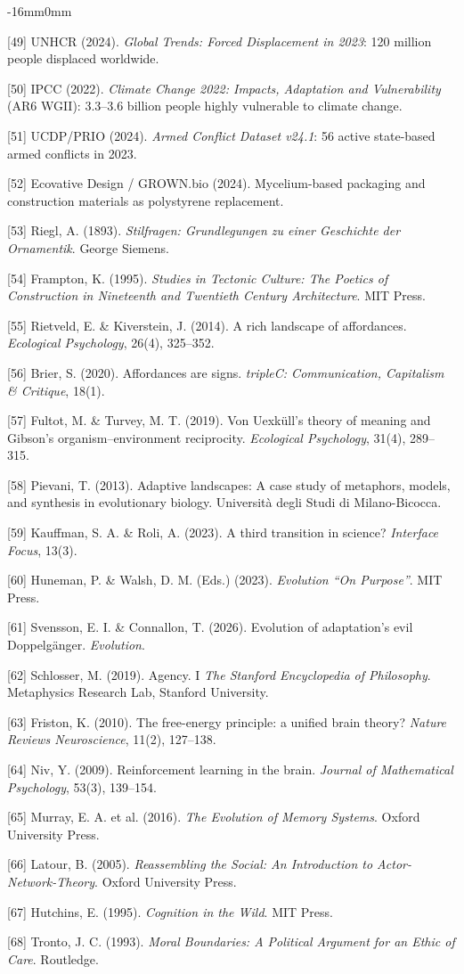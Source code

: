 \documentclass[10pt,oneside]{book}
\newcommand{\refentry}[1]{%
  \par\addvspace{0pt}%
  \begingroup\footnotesize\linespread{0.92}\selectfont
  \noindent\hangindent=4mm\hangafter=1 #1\par%
  \endgroup
}
\newenvironment{widebody}{%
  \begin{adjustwidth}{-16mm}{0mm}%
}{%
  \end{adjustwidth}%
}
\begin{document}
\begin{widebody}
\refentry{[49] UNHCR (2024). \textit{Global Trends: Forced Displacement in 2023}: 120 million people displaced worldwide.}
\refentry{[50] IPCC (2022). \textit{Climate Change 2022: Impacts, Adaptation and Vulnerability} (AR6 WGII): 3.3--3.6 billion people highly vulnerable to climate change.}
\refentry{[51] UCDP/PRIO (2024). \textit{Armed Conflict Dataset v24.1}: 56 active state-based armed conflicts in 2023.}
\refentry{[52] Ecovative Design / GROWN.bio (2024). Mycelium-based packaging and construction materials as polystyrene replacement.}
\refentry{[53] Riegl, A. (1893). \textit{Stilfragen: Grundlegungen zu einer Geschichte der Ornamentik}. George Siemens.}
\refentry{[54] Frampton, K. (1995). \textit{Studies in Tectonic Culture: The Poetics of Construction in Nineteenth and Twentieth Century Architecture}. MIT Press.}
\refentry{[55] Rietveld, E. \& Kiverstein, J. (2014). A rich landscape of affordances. \textit{Ecological Psychology}, 26(4), 325--352.}
\refentry{[56] Brier, S. (2020). Affordances are signs. \textit{tripleC: Communication, Capitalism \& Critique}, 18(1).}
\refentry{[57] Fultot, M. \& Turvey, M. T. (2019). Von Uexküll's theory of meaning and Gibson's organism--environment reciprocity. \textit{Ecological Psychology}, 31(4), 289--315.}
\refentry{[58] Pievani, T. (2013). Adaptive landscapes: A case study of metaphors, models, and synthesis in evolutionary biology. Università degli Studi di Milano-Bicocca.}
\refentry{[59] Kauffman, S. A. \& Roli, A. (2023). A third transition in science? \textit{Interface Focus}, 13(3).}
\refentry{[60] Huneman, P. \& Walsh, D. M. (Eds.) (2023). \textit{Evolution ``On Purpose''}. MIT Press.}
\refentry{[61] Svensson, E. I. \& Connallon, T. (2026). Evolution of adaptation's evil Doppelgänger. \textit{Evolution}.}
\refentry{[62] Schlosser, M. (2019). Agency. I \textit{The Stanford Encyclopedia of Philosophy}. Metaphysics Research Lab, Stanford University.}
\refentry{[63] Friston, K. (2010). The free-energy principle: a unified brain theory? \textit{Nature Reviews Neuroscience}, 11(2), 127--138.}
\refentry{[64] Niv, Y. (2009). Reinforcement learning in the brain. \textit{Journal of Mathematical Psychology}, 53(3), 139--154.}
\refentry{[65] Murray, E. A. et al. (2016). \textit{The Evolution of Memory Systems}. Oxford University Press.}
\refentry{[66] Latour, B. (2005). \textit{Reassembling the Social: An Introduction to Actor-Network-Theory}. Oxford University Press.}
\refentry{[67] Hutchins, E. (1995). \textit{Cognition in the Wild}. MIT Press.}
\refentry{[68] Tronto, J. C. (1993). \textit{Moral Boundaries: A Political Argument for an Ethic of Care}. Routledge.}

\end{widebody}
\end{document}
